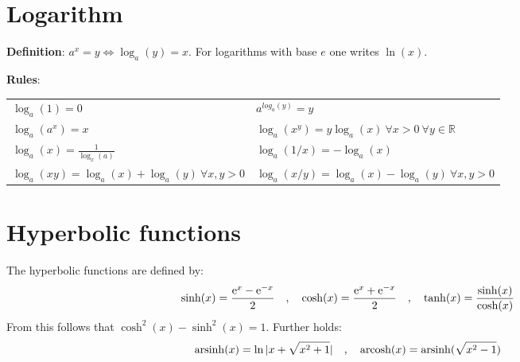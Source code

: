 \section{Logarithm}
{\bf Definition}: $a^x=y\Leftrightarrow\log_a(y)=x $. For logarithms with
base $e$ one writes $\ln(x)$.

{\bf Rules}:

\begin{tabular}{ l l }
$ \displaystyle \log_a(1)=0 $ &
$ \displaystyle a^{log_a(y)}=y $ \\
$ \displaystyle \log_a(a^x)=x $ &
$ \displaystyle \log_a(x^y)=y\log_a(x) \ \forall x>0 \ \forall y \in \mathbb{R} $ \\
$ \displaystyle \log_a(x)=\frac{1}{\log_x(a)} $ &
$ \displaystyle \log_a\left(1/x\right)=-\log_a(x) $ \\
$ \displaystyle \log_a(xy) = \log_a(x)+\log_a(y) \  \forall x,y>0 $ &
$ \displaystyle \log_a(x/y) = \log_a(x)-\log_a(y) \ \forall x,y>0 $
\end{tabular}


\section{Hyperbolic functions}
The hyperbolic functions are defined by:
\[
\sinh(x)=\frac{{\rm e}^x-{\rm e}^{-x}}{2}~~~,~~~\cosh(x)=\frac{{\rm e}^x+{\rm e}^{-x}}{2}~~~,~~~\tanh(x)=\frac{\sinh(x)}{\cosh(x)}
\]
From this follows that $\cosh^2(x)-\sinh^2(x)=1$. Further holds:
\[
{\rm arsinh}(x)=\ln|x+\sqrt{x^2+1}|~~~,~~~{\rm arcosh}(x)={\rm arsinh}(\sqrt{x^2-1})
\]

